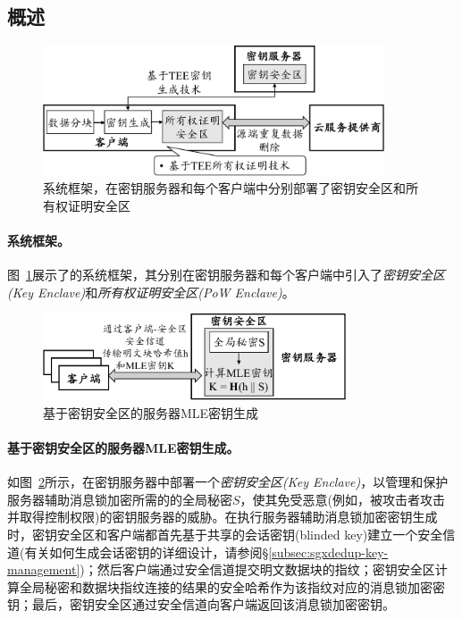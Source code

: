 \subsection{概述}
\label{subsec:sgxdedup-arch}

\begin{figure}[!htb]
    \centering
    \includegraphics[width=0.9\textwidth]{pic/sgxdedup/sgxdedup-arch.pdf}
    \caption{\sysnameS 系统框架，在密钥服务器和每个客户端中分别部署了密钥安全区和所有权证明安全区}
    \label{fig:sgxdedup-overview}
\end{figure}

\paragraph*{\sysnameS 系统框架。}图~\ref{fig:sgxdedup-overview}展示了\sysnameS 的系统框架，其分别在密钥服务器和每个客户端中引入了\textit{密钥安全区(Key Enclave)}和\textit{所有权证明安全区(PoW Enclave)}。 

\begin{figure}[!htb]
    \centering
    \includegraphics[width=0.8\textwidth]{pic/sgxdedup/key-enclave.pdf}
    \caption{基于密钥安全区的服务器MLE密钥生成}
    \label{fig:sgxdedup-overview-key}
\end{figure}

\paragraph*{基于密钥安全区的服务器MLE密钥生成。}如图~\ref{fig:sgxdedup-overview-key}所示，\sysnameS 在密钥服务器中部署一个\textit{密钥安全区(Key Enclave)}，以管理和保护服务器辅助消息锁加密所需的的全局秘密$S$，使其免受恶意(例如，被攻击者攻击并取得控制权限)的密钥服务器的威胁。在执行服务器辅助消息锁加密密钥生成时，密钥安全区和客户端都首先基于共享的会话密钥(blinded key)建立一个安全信道(有关如何生成会话密钥的详细设计，请参阅\S\ref{subsec:sgxdedup-key-management})；然后客户端通过安全信道提交明文数据块的指纹；密钥安全区计算全局秘密和数据块指纹连接的结果的安全哈希作为该指纹对应的消息锁加密密钥；最后，密钥安全区通过安全信道向客户端返回该消息锁加密密钥。

